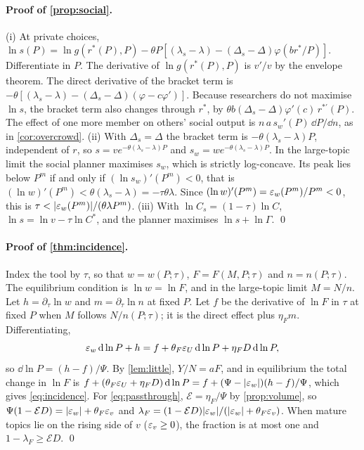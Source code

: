 \paragraph{Proof of \cref{prop:social}.} (i) At private choices, $\ln s(P)=\ln g(r^*(P),P)-\theta P[(\lambda_s-\lambda)-(\Delta_s-\Delta)\varphi(br^*/P)]$. Differentiate in $P$. The derivative of $\ln g(r^*(P),P)$ is $v'/v$ by the envelope theorem. The direct derivative of the bracket term is $-\theta[(\lambda_s-\lambda)-(\Delta_s-\Delta)(\varphi-c\varphi')]$. Because researchers do not maximise $\ln s$, the bracket term also changes through $r^*$, by $\theta b(\Delta_s-\Delta)\varphi'(c)\,r^{*\prime}(P)$. The effect of one more member on others' social output is $n\,a\,s_w'(P)\,\dd P/\dd n$, as in \cref{cor:overcrowd}. (ii) With $\Delta_s=\Delta$ the bracket term is $-\theta(\lambda_s-\lambda)P$, independent of $r$, so $s=ve^{-\theta(\lambda_s-\lambda)P}$ and $s_w=we^{-\theta(\lambda_s-\lambda)P}$. In the large-topic limit the social planner maximises $s_w$, which is strictly log-concave. Its peak lies below $P^m$ if and only if $(\ln s_w)'(P^m)<0$, that is $(\ln w)'(P^m)<\theta(\lambda_s-\lambda)=-\tau\theta\lambda$. Since $(\ln w)'(P^m)=\varepsilon_w(P^m)/P^m<0$, this is $\tau<|\eps_w(P^m)|/(\theta\lambda P^m)$. (iii) With $\ln C_s=(1-\tau)\ln C$, $\ln s=\ln v-\tau\ln C^*$, and the planner maximises $\ln s+\ln\Gamma$. \qed

\paragraph{Proof of \cref{thm:incidence}.} Index the tool by $\tau$, so that
$w=w(P;\tau)$, $F=F(M,P;\tau)$ and $n=n(P;\tau)$. The equilibrium condition is
$\ln w=\ln F$, and in the large-topic limit $M=N/n$. Let $h=\partial_\tau\ln w$ and $m=\partial_\tau\ln n$ at
fixed $P$. Let $f$ be the derivative of $\ln F$ in $\tau$ at fixed $P$ when $M$
follows $N/n(P;\tau)$; it is the direct effect plus $\eta_Fm$. Differentiating,
\[
\varepsilon_w\,\mathrm{d}\ln P+h=f+\theta_F\varepsilon_U\,\mathrm{d}\ln P+\eta_FD\,\mathrm{d}\ln P,
\]
so $\dd\ln P=(h-f)/\Psi$. By \cref{lem:little}, $Y/N=aF$, and in equilibrium the
total change in $\ln F$ is $f+(\theta_F\varepsilon_U+\eta_FD)\,\mathrm{d}\ln P=f+(\Psi-|\varepsilon_w|)(h-f)/\Psi$,
which gives \eqref{eq:incidence}. For \eqref{eq:passthrough}, $\mathcal E=\eta_F/\Psi$
by \cref{prop:volume}, so $\Psi(1-\mathcal ED)=|\varepsilon_w|+\theta_F\varepsilon_v$ and
$\lambda_F=(1-\mathcal ED)|\varepsilon_w|/(|\varepsilon_w|+\theta_F\varepsilon_v)$. When mature topics lie on
the rising side of $v$ ($\varepsilon_v\ge0$), the fraction is at most one and
$1-\lambda_F\ge\mathcal ED$. \qed

